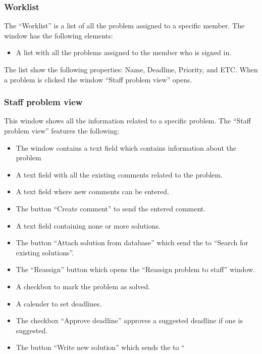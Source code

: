 

\subsubsection{Worklist}
The ``Worklist'' is a list of all the problem assigned to a specific \astaff member. The window has the following elements:
\begin{itemize}
	\item A list with all the problems assigned to the \astaff member who is signed in.
\end{itemize}
The list show the following properties: Name, Deadline, Priority, and ETC.
When a problem is clicked the window ``Staff problem view'' opens. 


\subsubsection{Staff problem view}
This window shows all the information related to a specific problem. 
The ``Staff problem view'' features the following:
\begin{itemize}
	\item The window contains a text field which contains information about the problem
	\item A text field with all the existing comments related to the problem.
	\item A text field where new comments can be entered.
	\item The button ``Create comment'' to send the entered comment.
	\item A text field containing none or more solutions.
	\item The button ``Attach solution from database'' which send the \astaff[] to ``Search for existing solutions''.  
	\item The ``Reassign'' button which opens the ``Reassign problem to staff'' window.
	\item A checkbox to mark the problem as solved.
	\item A calender to set deadlines.
	\item The checkbox ``Approve deadline'' approves a suggested deadline if one is suggested.
	\item The button ``Write new solution'' which sends the \astaff[] to ``
\end{itemize}

